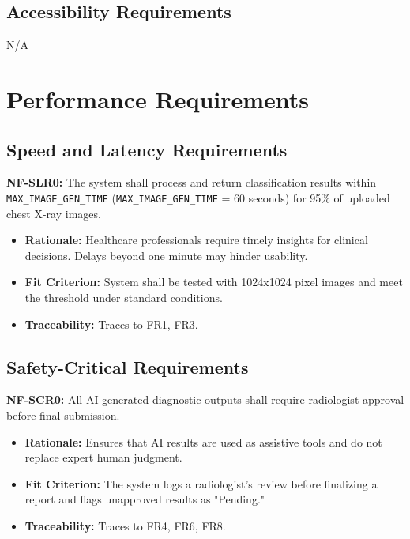 \documentclass[12pt]{article}
\begin{document}
\subsection{Accessibility Requirements}
N/A

\section{Performance Requirements}


\subsection{Speed and Latency Requirements}

\textbf{NF-SLR0:} The system shall process and return classification results within \texttt{MAX\_IMAGE\_GEN\_TIME} (\texttt{MAX\_IMAGE\_GEN\_TIME} = 60 seconds) for 95\% of uploaded chest X-ray images.


\begin{itemize}
    \item \textbf{Rationale:} Healthcare professionals require timely insights for clinical decisions. Delays beyond one minute may hinder usability.
    \item \textbf{Fit Criterion:} System shall be tested with 1024x1024 pixel images and meet the threshold under standard conditions.
    \item \textbf{Traceability:} Traces to FR1, FR3.
\end{itemize}

\subsection{Safety-Critical Requirements}

\textbf{NF-SCR0:} All AI-generated diagnostic outputs shall require radiologist approval before final submission.
\begin{itemize}
    \item \textbf{Rationale:} Ensures that AI results are used as assistive tools and do not replace expert human judgment.
    \item \textbf{Fit Criterion:} The system logs a radiologist's review before finalizing a report and flags unapproved results as "Pending."
    \item \textbf{Traceability:} Traces to FR4, FR6, FR8.
\end{itemize}
\end{document}
